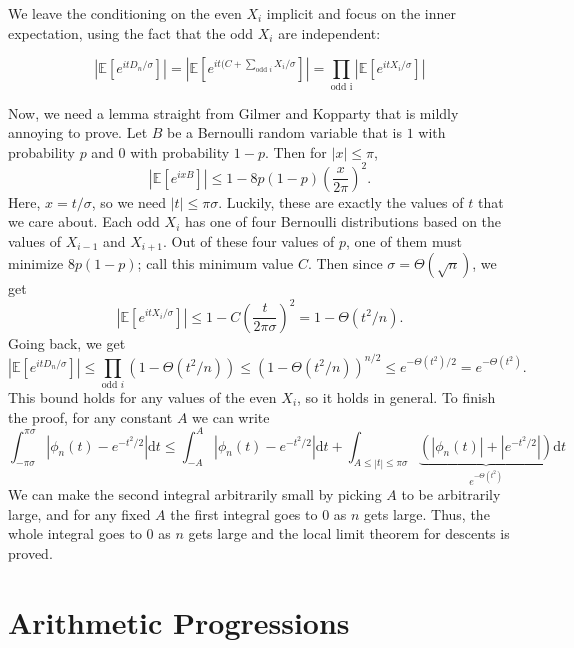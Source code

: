 \documentclass{article}
\newcommand{\p}[1]{\left(#1\right)}
\newcommand{\f}[2]{\frac{#1}{#2}}
\newcommand{\abs}[1]{\left\lvert#1\right\rvert}
\newcommand{\E}{\mathbb{E}}
\renewcommand{\d}{\mathrm{d}}
\begin{document}
	We leave the conditioning on the even $X_i$ implicit and focus on the inner expectation, using the fact that the odd $X_i$ are independent:

	\[
		\abs{\E[e^{itD_n/\sigma}]}
		= \abs{\E[e^{it(C + \sum\limits_{\text{odd } i} X_i/\sigma}]}
		= \prod_{\text{odd i}} \abs{\E[e^{itX_i/\sigma}]}
	\]

	Now, we need a lemma straight from Gilmer and Kopparty that is mildly annoying to prove. Let $B$ be a Bernoulli random variable that is $1$ with probability $p$ and $0$ with probability $1-p$. Then for $\abs{x} \leq \pi$,
	\[ \abs{\E[e^{ixB}]} \leq 1 - 8p(1-p) \p{\f{x}{2\pi}}^2. \]
	Here, $x = t/\sigma$, so we need $\abs{t} \leq \pi \sigma$. Luckily, these are exactly the values of $t$ that we care about. Each odd $X_i$ has one of four Bernoulli distributions based on the values of $X_{i-1}$ and $X_{i+1}$. Out of these four values of $p$, one of them must minimize $8p(1-p)$; call this minimum value $C$. Then since $\sigma = \Theta(\sqrt{n})$, we get
	\[ \abs{\E[e^{itX_i/\sigma}]} \leq 1 - C\p{\f{t}{2\pi \sigma}}^2 = 1 - \Theta(t^2/n). \]
	Going back, we get
	\[
		\abs{\E[e^{itD_n/\sigma}]}
		\leq \prod_{\text{odd } i} (1 - \Theta(t^2/n))
		\leq (1 - \Theta(t^2/n))^{n/2}
		\leq e^{-\Theta(t^2)/2}
		= e^{-\Theta(t^2)}.
	\]
	This bound holds for any values of the even $X_i$, so it holds in general. To finish the proof, for any constant $A$ we can write
	\[
		\int_{-\pi \sigma}^{\pi \sigma} \abs{\phi_n(t) - e^{-t^2/2}} \d t
		\leq \int_{-A}^{A} \abs{\phi_n(t) - e^{-t^2/2}} \d t
		+ \int_{A \leq \abs{t} \leq \pi \sigma} \underbrace{(\abs{\phi_n(t)} + |e^{-t^2/2}|)}_{e^{-\Theta(t^2)}} \d t
	\]
	We can make the second integral arbitrarily small by picking $A$ to be arbitrarily large, and for any fixed $A$ the first integral goes to $0$ as $n$ gets large. Thus, the whole integral goes to $0$ as $n$ gets large and the local limit theorem for descents is proved.


	\section*{Arithmetic Progressions}
\end{document}
